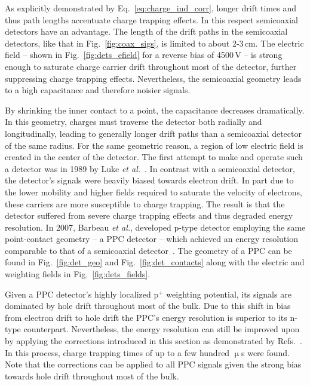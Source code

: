 As explicitly demonstrated by Eq.~\ref{eq:charge_ind_corr}, longer drift times and thus path lengths accentuate charge trapping effects. In this respect semicoaxial detectors have an advantage. The length of the drift paths in the semicoaxial detectors, like that in Fig.~\ref{fig:coax_sigs}, is limited to about 2-3\,cm. The electric field -- shown in Fig.~\ref{fig:dets_efield} for a reverse bias of 4500\,V -- is strong enough to saturate charge carrier drift throughout most of the detector, further suppressing charge trapping effects. Nevertheless, the semicoaxial geometry leads to a high capacitance and therefore noisier signals. 

By shrinking the inner contact to a point, the capacitance decreases dramatically. In this geometry, charges must traverse the detector both radially and longitudinally, leading to generally longer drift paths than a semicoaxial detector of the same radius. For the same geometric reason, a region of low electric field is created in the center of the detector. The first attempt to make and operate such a detector was in 1989 by Luke \textit{et al.}~\cite{npc}. In contrast with a semicoaxial detector, the detector's signals were heavily biased towards electron drift. In part due to the lower mobility and higher fields required to saturate the velocity of electrons, these carriers are more susceptible to charge trapping. The result is that the detector suffered from severe charge trapping effects and thus degraded energy resolution. In 2007, Barbeau \textit{et al.}, developed p-type detector employing the same point-contact geometry -- a PPC detector -- which achieved an energy resolution comparable to that of a semicoaxial detector~\cite{ppc}. The geometry of a PPC can be found in Fig.~\ref{fig:det_geo} and Fig.~\ref{fig:det_contacts} along with the electric and weighting fields in Fig.~\ref{fig:dets_fields}. 

Given a PPC detector's highly localized p$^+$ weighting potential, its signals are dominated by hole drift throughout most of the bulk. Due to this shift in bias from electron drift to hole drift the PPC's energy resolution is superior to its n-type counterpart. Nevertheless, the energy resolution can still be improved upon by applying the corrections introduced in this section as demonstrated by Refs.~\cite{ppc_charge_trapping1,ppc_charge_trapping2, mjd_charge_trapping}. In this process, charge trapping times of up to a few hundred $\upmu$s were found. Note that the corrections can be applied to all PPC signals given the strong bias towards hole drift throughout most of the bulk.


